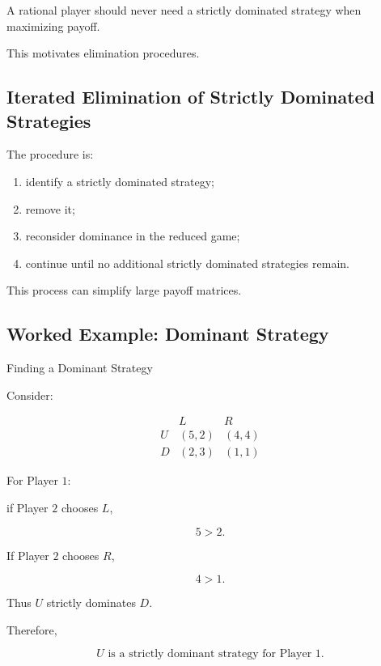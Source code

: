 A rational player should never need a strictly dominated strategy when
maximizing payoff.

This motivates elimination procedures.

\subsection{Iterated Elimination of Strictly Dominated Strategies}
\label{subsec:iterated-elimination}

The procedure is:

\begin{enumerate}
    \item identify a strictly dominated strategy;
    \item remove it;
    \item reconsider dominance in the reduced game;
    \item continue until no additional strictly dominated strategies
          remain.
\end{enumerate}

This process can simplify large payoff matrices.

\subsection{Worked Example: Dominant Strategy}
\label{subsec:worked-dominant-strategy}

\begin{workedexamplebox}{Finding a Dominant Strategy}

Consider:

\[
\begin{array}{c|cc}
&
L
&
R
\\
\hline
U
&
(5,2)
&
(4,4)
\\
D
&
(2,3)
&
(1,1)
\end{array}
\]

For Player \(1\):

if Player \(2\) chooses \(L\),

\[
5>2.
\]

If Player \(2\) chooses \(R\),

\[
4>1.
\]

Thus \(U\) strictly dominates \(D\).

Therefore,

\begin{answerbox}
\[
\boxed{
U
\text{ is a strictly dominant strategy for Player }1.
}
\]
\end{answerbox}

\end{workedexamplebox}

